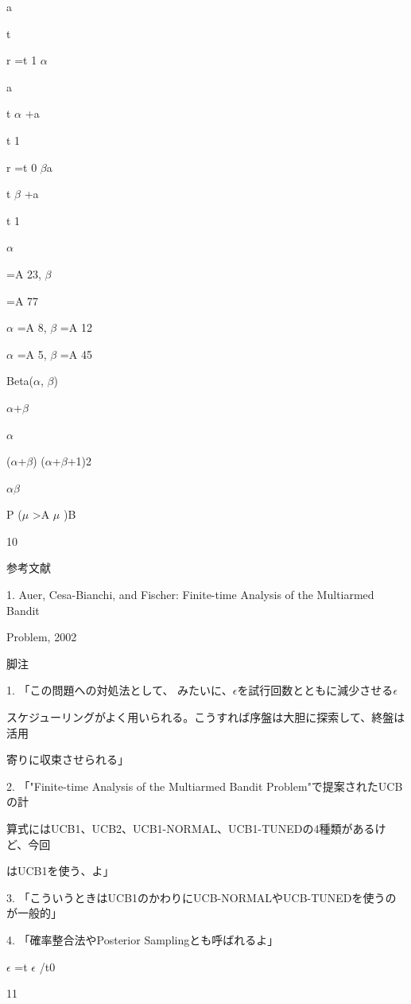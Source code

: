 a\par
t\par
r  =t 1 $\alpha$\par
a\par
t $\alpha$  +a\par
t 1\par
r  =t 0 $\beta$a\par
t $\beta$  +a\par
t 1\par
$\alpha$\par
=A 23, $\beta$\par
=A 77\par
$\alpha$  =A 8, $\beta$  =A 12\par
$\alpha$  =A 5, $\beta$  =A 45\par
Beta($\alpha$, $\beta$)\par
$\alpha$+$\beta$\par
$\alpha$\par
($\alpha$+$\beta$) ($\alpha$+$\beta$+1)2\par
$\alpha$$\beta$\par
P ($\mu$  >A $\mu$  )B\par
10\par

参考⽂献\par
1. Auer, Cesa-Bianchi, and Fischer: Finite-time Analysis of the Multiarmed Bandit\par
Problem, 2002\par
脚注\par
1. 「この問題への対処法として、 みたいに、$\epsilon$を試⾏回数とともに減少させる$\epsilon$\par
スケジューリングがよく⽤いられる。こうすれば序盤は⼤胆に探索して、終盤は活⽤\par
寄りに収束させられる」\par
2. 「"Finite-time Analysis of the Multiarmed Bandit Problem"で提案されたUCBの計\par
算式にはUCB1、UCB2、UCB1-NORMAL、UCB1-TUNEDの4種類があるけど、今回\par
はUCB1を使う、よ」\par
3. 「こういうときはUCB1のかわりにUCB-NORMALやUCB-TUNEDを使うのが⼀般的」\par
4. 「確率整合法やPosterior Samplingとも呼ばれるよ」\par
$\epsilon$  =t $\epsilon$  /t0\par
11\par

